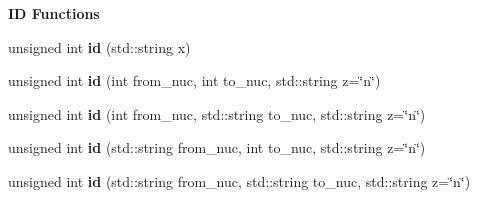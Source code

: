 \begin{Indent}{\bf I\-D Functions}
\begin{DoxyCompactItemize}
\item 
\hypertarget{namespacepyne_1_1rxname_a9b0d87bb265015fa308a8a601a89c738}{unsigned int {\bfseries id} (std\-::string x)}\label{namespacepyne_1_1rxname_a9b0d87bb265015fa308a8a601a89c738}

\item 
\hypertarget{namespacepyne_1_1rxname_ac2712f73fe136c8a091ec5b55867c101}{unsigned int {\bfseries id} (int from\-\_\-nuc, int to\-\_\-nuc, std\-::string z=\char`\"{}n\char`\"{})}\label{namespacepyne_1_1rxname_ac2712f73fe136c8a091ec5b55867c101}

\item 
\hypertarget{namespacepyne_1_1rxname_a59db818b92ee0c58e5da5e29ecccb7b3}{unsigned int {\bfseries id} (int from\-\_\-nuc, std\-::string to\-\_\-nuc, std\-::string z=\char`\"{}n\char`\"{})}\label{namespacepyne_1_1rxname_a59db818b92ee0c58e5da5e29ecccb7b3}

\item 
\hypertarget{namespacepyne_1_1rxname_aeef408cf1b26de2f7828c35981db3f88}{unsigned int {\bfseries id} (std\-::string from\-\_\-nuc, int to\-\_\-nuc, std\-::string z=\char`\"{}n\char`\"{})}\label{namespacepyne_1_1rxname_aeef408cf1b26de2f7828c35981db3f88}

\item 
\hypertarget{namespacepyne_1_1rxname_a8b635b6cfe404af21b0a0c7744d911aa}{unsigned int {\bfseries id} (std\-::string from\-\_\-nuc, std\-::string to\-\_\-nuc, std\-::string z=\char`\"{}n\char`\"{})}\label{namespacepyne_1_1rxname_a8b635b6cfe404af21b0a0c7744d911aa}

\end{DoxyCompactItemize}
\end{Indent}
